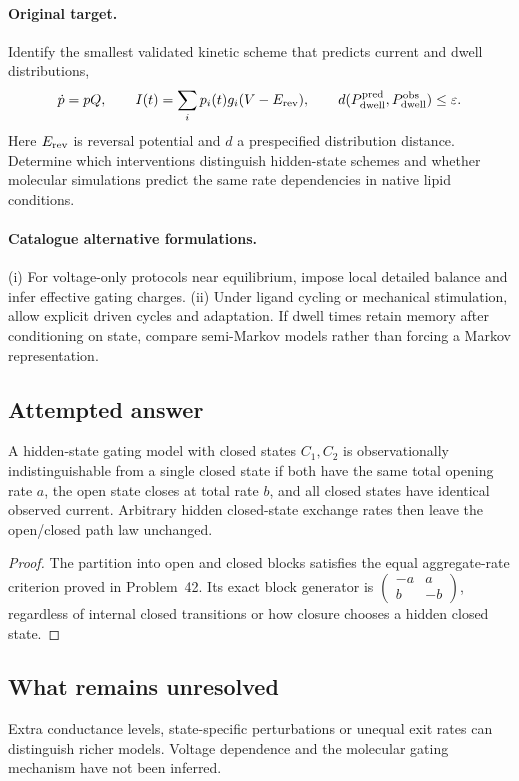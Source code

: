 \documentclass[11pt]{article}
\begin{document}
\paragraph{Original target.}
Identify the smallest validated kinetic scheme that predicts current and dwell distributions,
\[\dot p=pQ,\qquad I(t)=\sum_i p_i(t)g_i(V-E_{\rm rev}),\qquad d(P_{\rm dwell}^{\rm pred},P_{\rm dwell}^{\rm obs})\le\varepsilon.\]
Here $E_{\rm rev}$ is reversal potential and $d$ a prespecified distribution distance. Determine which interventions distinguish hidden-state schemes and whether molecular simulations predict the same rate dependencies in native lipid conditions.
\paragraph{Catalogue alternative formulations.}
(i) For voltage-only protocols near equilibrium, impose local detailed balance and infer effective gating charges. (ii) Under ligand cycling or mechanical stimulation, allow explicit driven cycles and adaptation. If dwell times retain memory after conditioning on state, compare semi-Markov models rather than forcing a Markov representation.
\subsection{Attempted answer}
\begin{proposition}
A hidden-state gating model with closed states $C_1,C_2$ is observationally indistinguishable from a single closed state if both have the same total opening rate $a$, the open state closes at total rate $b$, and all closed states have identical observed current. Arbitrary hidden closed-state exchange rates then leave the open/closed path law unchanged.
\end{proposition}
\begin{proof}
The partition into open and closed blocks satisfies the equal aggregate-rate criterion proved in Problem~42. Its exact block generator is $\left(\begin{smallmatrix}-a&a\\b&-b\end{smallmatrix}\right)$, regardless of internal closed transitions or how closure chooses a hidden closed state.
\end{proof}
\subsection{What remains unresolved}
Extra conductance levels, state-specific perturbations or unequal exit rates can distinguish richer models. Voltage dependence and the molecular gating mechanism have not been inferred.
\end{document}
